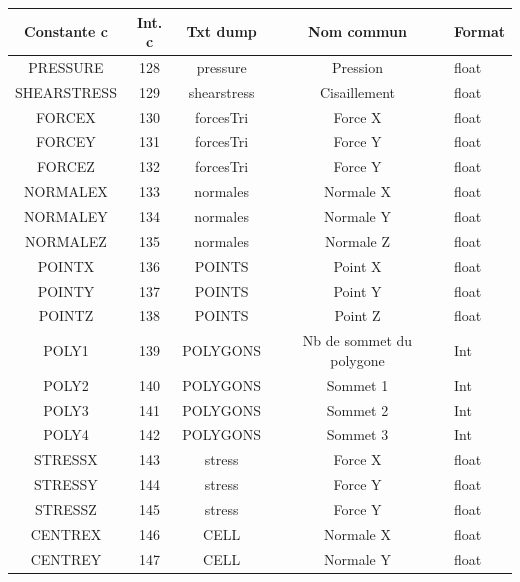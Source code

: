 \documentclass[a4paper,12pt]{article}
\begin{document}
{{{\begin{table}
\begin{minipage}{\linewidth}
\renewcommand{\footnoterule}{}
\renewcommand{\thefootnote}{\alph{footnote}}
\begin{tabular}{|c|c|c|c|l|} \hline
  \textbf{Constante c} & \textbf{Int. c} & \textbf{Txt dump} & \textbf{Nom commun} & \textbf{Format} \\ \hline
   \color{red} PRESSURE & 128 & pressure & Pression & float \\ \hline
   \color{red}SHEARSTRESS & 129 & shearstress & Cisaillement & float \\ \hline
   \color{red}FORCEX & 130 & forcesTri\footnotemark[1]  &Force X & float \\ \hline
   \color{red}FORCEY & 131 & forcesTri\footnotemark[1]  & Force Y & float \\ \hline
   \color{red}FORCEZ & 132 & forcesTri\footnotemark[1]  & Force Y & float \\ \hline
   \color{red}NORMALEX & 133 & normales  & Normale X & float \\ \hline
   \color{red}NORMALEY & 134 & normales & Normale Y & float \\ \hline
   \color{red}NORMALEZ & 135 & normales &Normale Z & float \\ \hline
   \color{red}POINTX & 136 & POINTS & Point X & float \\ \hline
   \color{red}POINTY & 137 & POINTS & Point Y & float \\ \hline
   \color{red}POINTZ & 138 & POINTS & Point Z & float \\ \hline
   \color{red}POLY1 & 139 & POLYGONS & Nb de sommet du polygone & Int \\ \hline
   \color{red}POLY2 & 140 & POLYGONS & Sommet 1 & Int \\ \hline
   \color{red}POLY3 & 141 & POLYGONS & Sommet 2 & Int \\ \hline
   \color{red}POLY4 & 142 & POLYGONS & Sommet 3 & Int \\ \hline 
   \color{red}STRESSX & 143 & stress\footnotemark[2]  &Force X & float \\ \hline
   \color{red}STRESSY & 144 & stress\footnotemark[2]  &Force Y & float \\ \hline
   \color{red}STRESSZ & 145 & stress\footnotemark[2]  &Force Y & float \\ \hline
   \color{red}CENTREX & 146 & CELL\footnotemark[2]  &  Normale X & float \\ \hline
   \color{red}CENTREY & 147 & CELL\footnotemark[2]  & Normale Y & float \\ \hline

\end{tabular}
\end{minipage}
\end{table}}}}
\end{document}
